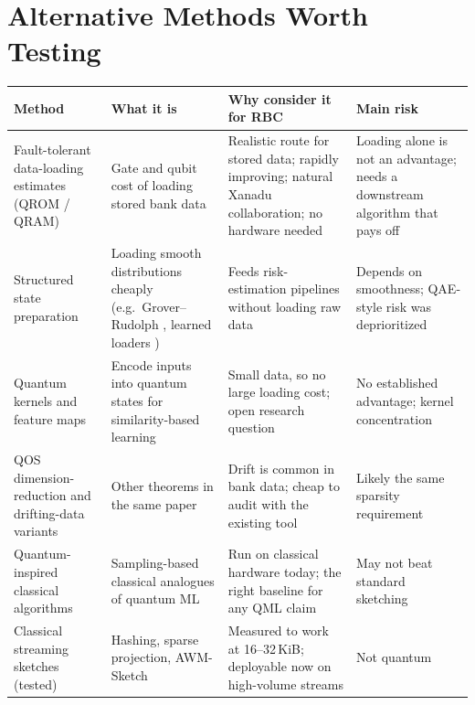 \documentclass[10pt]{article}
\newenvironment{sectionblock}
{%
    \par
    \vspace{2pt}
    \noindent
    \begin{minipage}{\textwidth}
}
{%
    \end{minipage}
    \par
    \vspace{5pt}
}
\begin{document}
\begin{sectionblock}

\section{Alternative Methods Worth Testing}
\label{sec:alt}

\begin{center}
\small
\begin{tabularx}{\textwidth}{@{}>{\raggedright\arraybackslash}p{}YYY@{}}
\toprule
\textbf{Method} & \textbf{What it is} & \textbf{Why consider it for RBC} & \textbf{Main risk} \\
\midrule
Fault-tolerant data-loading estimates (QROM / QRAM) & Gate and qubit cost of loading stored bank data \cite{motlagh2026dense,alonso2025} & Realistic route for stored data; rapidly improving; natural Xanadu collaboration; no hardware needed & Loading alone is not an advantage; needs a downstream algorithm that pays off \\
Structured state preparation & Loading smooth distributions cheaply (e.g.\ Grover--Rudolph \cite{grover2002}, learned loaders \cite{zoufal2019}) & Feeds risk-estimation pipelines without loading raw data & Depends on smoothness; QAE-style risk was deprioritized \\
Quantum kernels and feature maps & Encode inputs into quantum states for similarity-based learning \cite{havlicek2019} & Small data, so no large loading cost; open research question & No established advantage; kernel concentration \cite{thanasilp2024} \\
QOS dimension-reduction and drifting-data variants & Other theorems in the same paper \cite{zhao2026} & Drift is common in bank data; cheap to audit with the existing tool & Likely the same sparsity requirement \\
Quantum-inspired classical algorithms & Sampling-based classical analogues of quantum ML \cite{tang2019} & Run on classical hardware today; the right baseline for any QML claim & May not beat standard sketching \\
Classical streaming sketches (tested) & Hashing, sparse projection, AWM-Sketch & Measured to work at 16--32\,KiB; deployable now on high-volume streams & Not quantum \\
\bottomrule
\end{tabularx}
\end{center}

\end{sectionblock}
\end{document}
